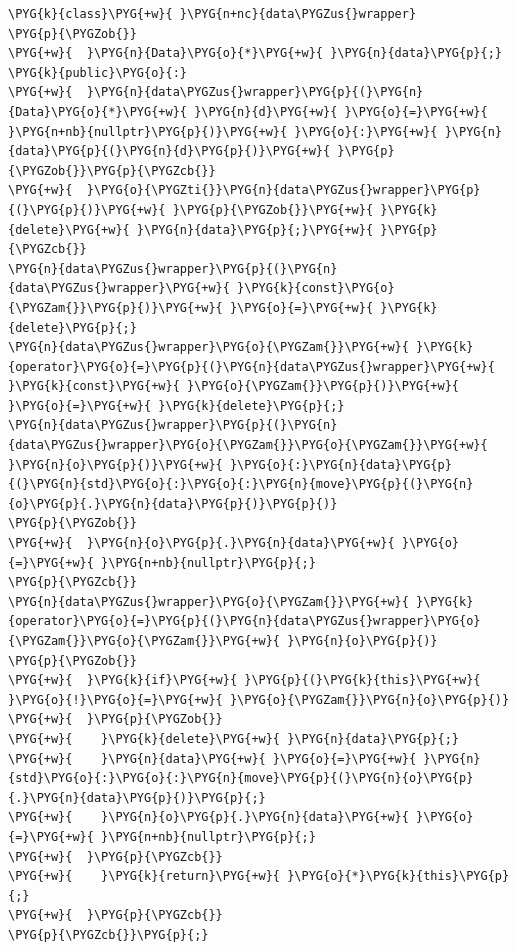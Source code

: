 \begin{itemize}
\begin{codeblockbg}
\begin{Verbatim}[commandchars=\\\{\},breaklines=true,breakanywhere=true,fontsize=\codefont,xleftmargin=17bp]
\PYG{k}{class}\PYG{+w}{ }\PYG{n+nc}{data\PYGZus{}wrapper}
\PYG{p}{\PYGZob{}}
\PYG{+w}{  }\PYG{n}{Data}\PYG{o}{*}\PYG{+w}{ }\PYG{n}{data}\PYG{p}{;}
\PYG{k}{public}\PYG{o}{:}
\PYG{+w}{  }\PYG{n}{data\PYGZus{}wrapper}\PYG{p}{(}\PYG{n}{Data}\PYG{o}{*}\PYG{+w}{ }\PYG{n}{d}\PYG{+w}{ }\PYG{o}{=}\PYG{+w}{ }\PYG{n+nb}{nullptr}\PYG{p}{)}\PYG{+w}{ }\PYG{o}{:}\PYG{+w}{ }\PYG{n}{data}\PYG{p}{(}\PYG{n}{d}\PYG{p}{)}\PYG{+w}{ }\PYG{p}{\PYGZob{}}\PYG{p}{\PYGZcb{}}
\PYG{+w}{  }\PYG{o}{\PYGZti{}}\PYG{n}{data\PYGZus{}wrapper}\PYG{p}{(}\PYG{p}{)}\PYG{+w}{ }\PYG{p}{\PYGZob{}}\PYG{+w}{ }\PYG{k}{delete}\PYG{+w}{ }\PYG{n}{data}\PYG{p}{;}\PYG{+w}{ }\PYG{p}{\PYGZcb{}}
\PYG{n}{data\PYGZus{}wrapper}\PYG{p}{(}\PYG{n}{data\PYGZus{}wrapper}\PYG{+w}{ }\PYG{k}{const}\PYG{o}{\PYGZam{}}\PYG{p}{)}\PYG{+w}{ }\PYG{o}{=}\PYG{+w}{ }\PYG{k}{delete}\PYG{p}{;}
\PYG{n}{data\PYGZus{}wrapper}\PYG{o}{\PYGZam{}}\PYG{+w}{ }\PYG{k}{operator}\PYG{o}{=}\PYG{p}{(}\PYG{n}{data\PYGZus{}wrapper}\PYG{+w}{ }\PYG{k}{const}\PYG{+w}{ }\PYG{o}{\PYGZam{}}\PYG{p}{)}\PYG{+w}{ }\PYG{o}{=}\PYG{+w}{ }\PYG{k}{delete}\PYG{p}{;}
\PYG{n}{data\PYGZus{}wrapper}\PYG{p}{(}\PYG{n}{data\PYGZus{}wrapper}\PYG{o}{\PYGZam{}}\PYG{o}{\PYGZam{}}\PYG{+w}{ }\PYG{n}{o}\PYG{p}{)}\PYG{+w}{ }\PYG{o}{:}\PYG{n}{data}\PYG{p}{(}\PYG{n}{std}\PYG{o}{:}\PYG{o}{:}\PYG{n}{move}\PYG{p}{(}\PYG{n}{o}\PYG{p}{.}\PYG{n}{data}\PYG{p}{)}\PYG{p}{)}
\PYG{p}{\PYGZob{}}
\PYG{+w}{  }\PYG{n}{o}\PYG{p}{.}\PYG{n}{data}\PYG{+w}{ }\PYG{o}{=}\PYG{+w}{ }\PYG{n+nb}{nullptr}\PYG{p}{;}
\PYG{p}{\PYGZcb{}}
\PYG{n}{data\PYGZus{}wrapper}\PYG{o}{\PYGZam{}}\PYG{+w}{ }\PYG{k}{operator}\PYG{o}{=}\PYG{p}{(}\PYG{n}{data\PYGZus{}wrapper}\PYG{o}{\PYGZam{}}\PYG{o}{\PYGZam{}}\PYG{+w}{ }\PYG{n}{o}\PYG{p}{)}
\PYG{p}{\PYGZob{}}
\PYG{+w}{  }\PYG{k}{if}\PYG{+w}{ }\PYG{p}{(}\PYG{k}{this}\PYG{+w}{ }\PYG{o}{!}\PYG{o}{=}\PYG{+w}{ }\PYG{o}{\PYGZam{}}\PYG{n}{o}\PYG{p}{)}
\PYG{+w}{  }\PYG{p}{\PYGZob{}}
\PYG{+w}{    }\PYG{k}{delete}\PYG{+w}{ }\PYG{n}{data}\PYG{p}{;}
\PYG{+w}{    }\PYG{n}{data}\PYG{+w}{ }\PYG{o}{=}\PYG{+w}{ }\PYG{n}{std}\PYG{o}{:}\PYG{o}{:}\PYG{n}{move}\PYG{p}{(}\PYG{n}{o}\PYG{p}{.}\PYG{n}{data}\PYG{p}{)}\PYG{p}{;}
\PYG{+w}{    }\PYG{n}{o}\PYG{p}{.}\PYG{n}{data}\PYG{+w}{ }\PYG{o}{=}\PYG{+w}{ }\PYG{n+nb}{nullptr}\PYG{p}{;}
\PYG{+w}{  }\PYG{p}{\PYGZcb{}}
\PYG{+w}{    }\PYG{k}{return}\PYG{+w}{ }\PYG{o}{*}\PYG{k}{this}\PYG{p}{;}
\PYG{+w}{  }\PYG{p}{\PYGZcb{}}
\PYG{p}{\PYGZcb{}}\PYG{p}{;}
\end{Verbatim}
\end{codeblockbg}



\end{itemize}
